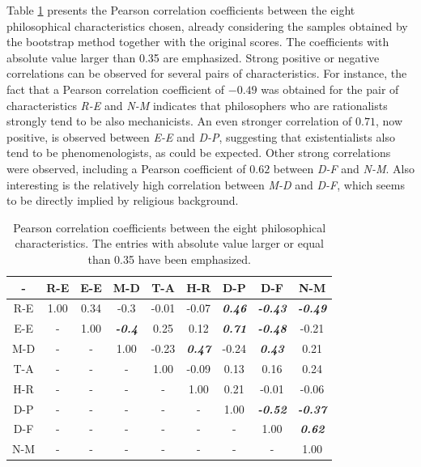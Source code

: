 \documentclass[%
 aip,
 jmp,%
 amsmath,amssymb,
 reprint,%
]{revtex4-1}
\begin{document}
Table \ref{tab:tableB} presents the Pearson correlation coefficients
between the eight philosophical characteristics chosen, already
considering the samples obtained by the bootstrap method together with
the original scores.  The
coefficients with absolute value larger than 0.35 are emphasized.
Strong positive or negative correlations can be observed for several
pairs of characteristics.  For instance, the fact that a Pearson
correlation coefficient of $-0.49$ was obtained for the pair of
characteristics \emph{R-E} and \emph{N-M} indicates that philosophers
who are rationalists strongly tend to be also mechanicists.  An even
stronger correlation of $0.71$, now positive, is observed between
\emph{E-E} and \emph{D-P}, suggesting that existentialists also tend
to be phenomenologists, as could be expected.  Other strong
correlations were observed, including a Pearson coefficient of $0.62$
between \emph{D-F} and \emph{N-M}.  Also interesting is the relatively
high correlation between \emph{M-D} and \emph{D-F}, which seems to be
directly implied by religious background.


\begin{table}\footnotesize%
\caption{\label{tab:tableB}Pearson correlation coefficients between the eight philosophical characteristics.  The entries with absolute
value larger or equal than 0.35 have been emphasized.}

\begin{ruledtabular}
\begin{tabular}{|c||c|c|c|c|c|c|c|c|}

- & R-E & E-E & M-D & T-A & H-R & D-P & D-F & N-M \\ \hline
R-E & 1.00 & 0.34 & -0.3 & -0.01 & -0.07 & {\bf \emph{  0.46}} & {\bf \emph{  -0.43}} & {\bf \emph{  -0.49}} \\
E-E & -    & 1.00 & {\bf \emph{  -0.4}} & 0.25 & 0.12 & {\bf \emph{  0.71}} & {\bf \emph{  -0.48}} & -0.21 \\
M-D & -    & -    & 1.00 & -0.23 & {\bf \emph{  0.47}} & -0.24 & {\bf \emph{  0.43}} & 0.21 \\
T-A & -    & -    & -    & 1.00 & -0.09 & 0.13  & 0.16 & 0.24 \\
H-R & -    & -    & -    & -    & 1.00 & 0.21 & -0.01 & -0.06 \\ 
D-P & -    & -    & -    & -    & -    & 1.00 & {\bf \emph{  -0.52}}  & {\bf \emph{  -0.37}} \\
D-F & -    & -    & -    & -    & -    & -    & 1.00 & {\bf \emph{  0.62}} \\
N-M & -    & -    & -    & -    & -    & -    & -    & 1.00 \\

\end{tabular}
\end{ruledtabular}
\end{table}
\end{document}
